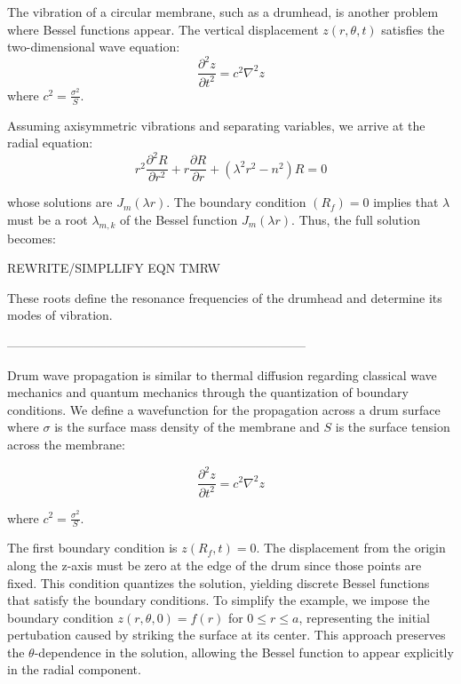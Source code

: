 \documentclass[linenumbers, twocolumn]{aastex631}
\begin{document}
The vibration of a circular membrane, such as a drumhead, is another problem
where Bessel functions appear. The vertical displacement $z(r,\theta,t)$
satisfies the two-dimensional wave equation:
\begin{equation}
    \frac{\partial^2z}{\partial t^2}=c^2\nabla^2z
\end{equation}
\noindent where $c^2=\frac{\sigma^2}{S}$.

\noindent Assuming axisymmetric vibrations and separating variables, we arrive
at the radial equation:
\begin{equation}
    r^2\frac{\partial^2R}{\partial r^2}+r\frac{\partial R}{\partial r}+(\lambda^2r^2-n^2)R=0
\end{equation}

\noindent whose solutions are $J_m(\lambda r)$. The boundary condition $(R_f)=0$
implies that $\lambda$ must be a root $\lambda_{m,k}$ of the Bessel function
$J_m(\lambda r)$. Thus, the full solution becomes:

REWRITE/SIMPLLIFY EQN TMRW


\noindent These roots define the resonance frequencies of the drumhead and
determine its modes of vibration.


------------------------------------------------------------------------

Drum wave propagation is similar to thermal diffusion regarding classical wave 
mechanics and quantum mechanics through the quantization of boundary conditions.
We define a wavefunction for the propagation across a drum surface where $\sigma$
is the surface mass density of the membrane and $S$ is the surface tension
across the membrane:

\begin{equation}
    \frac{\partial^2z}{\partial t^2}=c^2\nabla^2z
\end{equation}

\noindent where $c^2=\frac{\sigma^2}{S}$.

\noindent The first boundary condition is $z(R_f,t)=0$. The displacement from the origin
along the z-axis must be zero at the edge of the drum since those points are
fixed. This condition quantizes the solution, yielding discrete Bessel functions
that satisfy the boundary conditions. To simplify the example, we impose the boundary
condition $z(r,\theta,0)=f(r)$ for $0\leq r \leq a$, representing the initial
pertubation caused by striking the surface at its center. This approach preserves
the $\theta$-dependence in the solution, allowing the Bessel function to appear
explicitly in the radial component.
\end{document}
